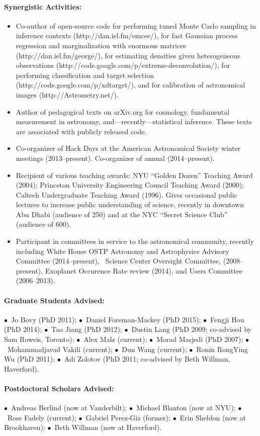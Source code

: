\documentclass[12pt]{article}
\begin{document}
\paragraph{Synergistic Activities:}
\begin{itemize}\setlength{\itemsep}{0pt}
\item
Co-author of open-source code
for performing tuned Monte Carlo sampling in inference contexts (http://dan.iel.fm/emcee/),
for fast Gaussian process regression and marginalization with enormous matrices (http://dan.iel.fm/george/),
for estimating densities given heterogeneous observations (http://code.google.com/p/extreme-deconvolution/),
for performing classification and target selection (http://code.google.com/p/xdtarget/),
and
for calibration of astronomical images (http://Astrometry.net/).
\item
Author of pedagogical texts on arXiv.org for cosmology, fundamental
measurement in astronomy, and---recently---statistical inference.
These texts are associated with publicly released code.
\item
Co-organizer of Hack Days at the American Astronomical Society winter meetings (2013--present).
Co-organizer of annual  (2014--present).
\item
Recipient of various teaching awards: 
NYU ``Golden Dozen'' Teaching Award (2004);
Princeton University Engineering Council Teaching Award (2000);
Caltech Undergraduate Teaching Award (1996).
Gives occasional public lectures to increase public understanding of
science, recently in downtown Abu Dhabi (audience of 250) and at
the NYC ``Secret Science Club'' (audience of 600).
\item
Participant in committees in service to the astronomical community,
recently including
White House OSTP Astronomy and Astrophysics Advisory Committee (2014--present),
\Spitzer\ Science Center Oversight Committee, (2008--present),
 Exoplanet Occurence Rate review (2014),
and
 Users Committee (2006--2013).
\end{itemize}

\paragraph{Graduate Students Advised:}
$\bullet$~Jo Bovy (PhD 2011);
$\bullet$~Daniel Foreman-Mackey (PhD 2015);
$\bullet$~Fengji Hou (PhD 2014);
$\bullet$~Tao Jiang (PhD 2012);
$\bullet$~Dustin Lang (PhD 2009; co-advised by Sam Roweis, Toronto);
$\bullet$~Alex Malz (current);
$\bullet$~Morad Masjedi (PhD 2007);
$\bullet$~Mohammadjavad Vakili (current);
$\bullet$~Dun Wang (current);
$\bullet$~Ronin RongYing Wu (PhD 2011);
$\bullet$~Adi Zolotov (PhD 2011; co-advised by Beth Willman, Haverford).

\paragraph{Postdoctoral Scholars Advised:}
$\bullet$~Andreas Berlind (now at Vanderbilt);
$\bullet$~Michael Blanton (now at NYU);
$\bullet$~Ross Fadely (current);
$\bullet$~Gabriel Perez-Giz (former);
$\bullet$~Erin Sheldon (now at Brookhaven);
$\bullet$~Beth Willman (now at Haverford).
\end{document}
